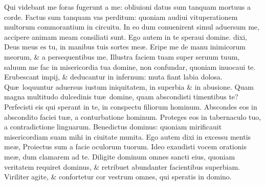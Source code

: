 \documentclass[a5paper,10pt]{book}
\def\ae{æ}
\begin{document}
\begin{multicols*}{2}
\newline \color{red} Q\color{black}ui videbant me foras fugerunt a me: obliuioni datus sum tanquam mortuus a corde.
\newline \color{red} F\color{black}actus sum tanquam vas perditum: quoniam audiui vituperationem multorum commorantium in circuitu.
\newline \color{red} I\color{black}n eo dum conuenirent simul aduersum me, accipere animam meam consiliati sunt.
\newline \color{red} E\color{black}go autem in te speraui domine. dixi, Deus meus es tu, in manibus tuis sortes me\ae .
\newline \color{red} E\color{black}ripe me de manu inimicorum meorum, \& a persequentibus me.
\newline \color{red} I\color{black}llustra faciem tuam super seruum tuum, saluum me fac in misericordia tua domine, non confundar, quoniam inuocaui te.
\newline \color{red} E\color{black}rubescant impij, \& deducantur in infernum: muta fiant labia dolosa.
\newline \color{red} Q\color{black}u\ae \ loquuntur aduersus iustum iniquitatem, in superbia \& in abusione.
\newline \color{red} Q\color{black}uam magna multitudo dulcedinis tu\ae \ domine, quam abscondisti timentibus te?
\newline \color{red} P\color{black}erfecisti eis qui sperant in te, in conspectu filiorum hominum.
\newline \color{red} A\color{black}bscondes eos in abscondito faciei tu\ae , a conturbatione hominum.
\newline \color{red} P\color{black}roteges eos in tabernaculo tuo, a contradictione linguarum.
\newline \color{red} B\color{black}enedictus dominus: quoniam mirificauit misericordiam suam mihi in ciuitate munita.
\newline \color{red} E\color{black}go autem dixi in excessu mentis me\ae , Proiectus sum a facie oculorum tuorum.
\newline \color{red} I\color{black}deo exaudisti vocem orationis me\ae , dum clamarem ad te.
\newline \color{red} D\color{black}iligite dominum omnes sancti eius, quoniam veritatem requiret dominus, \& retribuet abundanter facientibus superbiam.
\newline \color{red} V\color{black}iriliter agite, \& confortetur cor vestrum omnes, qui speratis in domino.

\end{multicols*}
\end{document}
